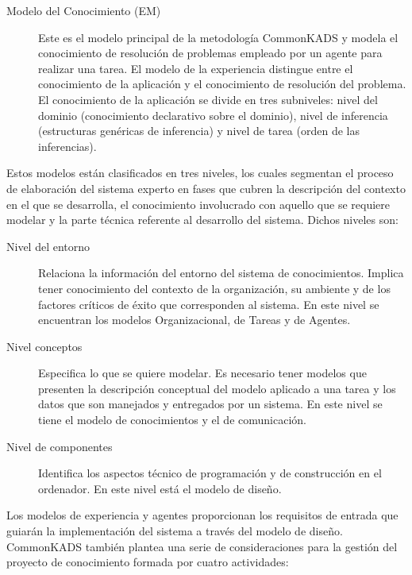 \begin{description}
\item[Modelo del Conocimiento (EM)] Este es el modelo principal de la metodología CommonKADS y modela el conocimiento de resolución de problemas empleado por un agente para realizar una tarea. El modelo de la experiencia distingue entre el conocimiento de la aplicación y el conocimiento de resolución del problema. El conocimiento de la aplicación se divide en tres subniveles: nivel del dominio (conocimiento declarativo sobre el dominio), nivel de inferencia (estructuras genéricas de inferencia) y nivel de tarea (orden de las inferencias).
\end{description}

Estos modelos están clasificados en tres niveles, los cuales segmentan el proceso de elaboración del sistema experto en fases que cubren la descripción del contexto en el que se desarrolla, el conocimiento involucrado con aquello que se requiere modelar y la parte técnica referente al desarrollo del sistema. Dichos niveles son:
\begin{description}
\item[Nivel del entorno] Relaciona la información del entorno del sistema de conocimientos. Implica tener conocimiento del contexto de la organización, su ambiente y de los factores críticos de éxito que corresponden al sistema. En este nivel se encuentran los modelos Organizacional, de Tareas y de Agentes.

\item[Nivel conceptos] Especifica lo que se quiere modelar. Es necesario tener modelos que presenten la descripción conceptual del modelo aplicado a una tarea y los datos que son manejados y entregados por un sistema. En este nivel se tiene el modelo de conocimientos y el de comunicación.

\item[Nivel de componentes] Identifica los aspectos técnico de programación y de construcción en el ordenador. En este nivel está el modelo de diseño.
\end{description}

Los modelos de experiencia y agentes proporcionan los requisitos de entrada que guiarán la implementación del sistema a través del modelo de diseño.
CommonKADS también plantea una serie de consideraciones para la gestión del proyecto de conocimiento formada por cuatro actividades:

